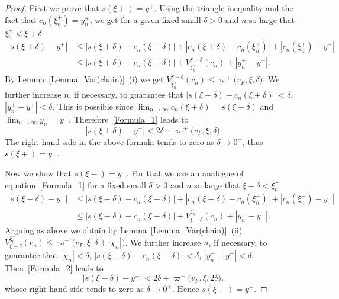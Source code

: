 \documentclass[final,3p,mathptmx]{article}%
\newcommand{\Var}[3]{V_{#1}^{#2}(#3) }
\newcommand{\NewLeftLocalModul}[3]{\varpi^{-}\big( {#1},{#2},{#3} \big)}
\newcommand{\NewRightLocalModul}[3]{\varpi^{+}\big( {#1},{#2},{#3} \big)}
\begin{document}
{{{\begin{proof}
	First we prove that $s(\xi+) = y^+$.
	Using the triangle inequality and the fact that $c_n(\xi_n^+)=y_n^+$, we get for a given fixed small $\delta>0$ and $n$ so large that
	$\xi_n^+<\xi+\delta$
	\begin{equation}\label{Formula_1}
		\begin{split}
			|s(\xi+\delta)-y^{+}| & \le
			|s(\xi+\delta)-c_n(\xi+\delta)|+|c_n(\xi+\delta)-c_n(\xi_n^+)|+|c_n(\xi_n^+) - y^{+}| \\&
			\le |s(\xi+\delta)-c_n(\xi+\delta)|+ \Var{\xi_n^+}{\xi+\delta}{c_n} +|y_n^{+}-y^{+}|.
		\end{split}
	\end{equation}	
	By Lemma~\ref{Lemma_Var(chain)}~(i) we get ${\Var{\xi_n^+}{\xi+\delta}{c_n} \le \NewRightLocalModul{v_F}{\xi}{\delta}}$.
	We further increase $n$, if necessary, to guarantee that $|s(\xi+\delta)-c_n(\xi+\delta)| < \delta$, ${|y_n^{+}-y^{+}| < \delta}$. This is possible since $\lim_{n \to \infty}c_n(\xi+\delta)=s(\xi+\delta)$ and $\lim_{n \to \infty}y_n^{+} =y^{+}$.  Therefore~\eqref{Formula_1} leads to
	$$ 
	|s(\xi+\delta)-y^{+}| < 2\delta + \NewRightLocalModul{v_F}{\xi}{\delta}.
	$$
	The right-hand side in the above formula tends to zero as $\delta \to 0^+$, thus $s(\xi+)=y^+$. 
	
	Now we show that $s(\xi-) = y^-$. For that we use an analogue of equation~\eqref{Formula_1} for a fixed small $\delta > 0$ and $n$ so large that ${\xi-\delta < \xi_n^-}$
	\begin{equation}\label{Formula_2}
		\begin{split}
			|s(\xi-\delta)-y^{-}| & \le
			|s(\xi-\delta)-c_n(\xi-\delta)|+|c_n(\xi-\delta)-c_n(\xi_n^-)|+|c_n(\xi_n^-) - y^{-}| \\&
			\le |s(\xi-\delta)-c_n(\xi-\delta)|+ V_{\xi-\delta}^{\xi_n^-}(c_n) +|y_n^{-}-y^{-}|.
		\end{split}
	\end{equation}
	Arguing as above we obtain by Lemma~\ref{Lemma_Var(chain)}~(ii) 
	${	V_{\xi-\delta}^{\xi_n^-}(c_n)\le \NewLeftLocalModul{v_F}{\xi}{\delta + |\chi_n|}}$.
	We further increase $n$, if necessary, to guarantee that $|\chi_n|<\delta$, $|s(\xi-\delta)-c_n(\xi-\delta)| < \delta$, ${|y_n^{-}-y^{-}| < \delta}$. 
	Then~\eqref{Formula_2} leads to
	$$ 
	|s(\xi-\delta)-y^{-}| < 2\delta + \NewLeftLocalModul{v_F}{\xi}{2\delta},
	$$
	whose right-hand side tends to zero as $\delta \to 0^+$. Hence $s(\xi-)=y^-$. 
\end{proof}
\medskip

}}}
\end{document}
